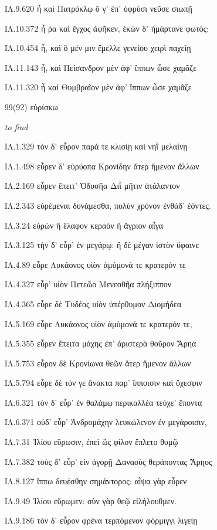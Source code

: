 \begin{enumerate}
{ΙΛ.9.620 ἦ καὶ Πατρόκλῳ ὅ γ' ἐπ' ὀφρύσι νεῦσε σιωπῇ 

ΙΛ.10.372 ἦ ῥα καὶ ἔγχος ἀφῆκεν, ἑκὼν δ' ἡμάρτανε φωτός: 

ΙΛ.10.454 ἦ, καὶ ὃ μέν μιν ἔμελλε γενείου χειρὶ παχείῃ 

ΙΛ.11.143 ἦ, καὶ Πείσανδρον μὲν ἀφ' ἵππων ὦσε χαμᾶζε 

ΙΛ.11.320 ἦ καὶ Θυμβραῖον μὲν ἀφ' ἵππων ὦσε χαμᾶζε 

}

\clearpage
\item[\large 99(92)]{\large \g εὑρίσκω}

\hspace{0.2cm} \textit{ to find }

{\g
ΙΛ.1.329 τὸν δ' εὗρον παρά τε κλισίῃ καὶ νηῒ μελαίνῃ 

ΙΛ.1.498 εὗρεν δ' εὐρύοπα Κρονίδην ἄτερ ἥμενον ἄλλων 

ΙΛ.2.169 εὗρεν ἔπειτ' Ὀδυσῆα Διῒ μῆτιν ἀτάλαντον 

ΙΛ.2.343 εὑρέμεναι δυνάμεσθα, πολὺν χρόνον ἐνθάδ' ἐόντες. 

ΙΛ.3.24 εὑρὼν ἢ ἔλαφον κεραὸν ἢ ἄγριον αἶγα 

ΙΛ.3.125 τὴν δ' εὗρ' ἐν μεγάρῳ: ἣ δὲ μέγαν ἱστὸν ὕφαινε 

ΙΛ.4.89 εὗρε Λυκάονος υἱὸν ἀμύμονά τε κρατερόν τε 

ΙΛ.4.327 εὗρ' υἱὸν Πετεῶο Μενεσθῆα πλήξιππον 

ΙΛ.4.365 εὗρε δὲ Τυδέος υἱὸν ὑπέρθυμον Διομήδεα 

ΙΛ.5.169 εὗρε Λυκάονος υἱὸν ἀμύμονά τε κρατερόν τε, 

ΙΛ.5.355 εὗρεν ἔπειτα μάχης ἐπ' ἀριστερὰ θοῦρον Ἄρηα 

ΙΛ.5.753 εὗρον δὲ Κρονίωνα θεῶν ἄτερ ἥμενον ἄλλων 

ΙΛ.5.794 εὗρε δὲ τόν γε ἄνακτα παρ' ἵπποισιν καὶ ὄχεσφιν 

ΙΛ.6.321 τὸν δ' εὗρ' ἐν θαλάμῳ περικαλλέα τεύχε' ἕποντα 

ΙΛ.6.371 οὐδ' εὗρ' Ἀνδρομάχην λευκώλενον ἐν μεγάροισιν, 

ΙΛ.7.31 Ἰλίου εὕρωσιν, ἐπεὶ ὣς φίλον ἔπλετο θυμῷ 

ΙΛ.7.382 τοὺς δ' εὗρ' εἰν ἀγορῇ Δαναοὺς θεράποντας Ἄρηος 

ΙΛ.8.127 ἵππω δευέσθην σημάντορος: αἶψα γὰρ εὗρεν 

ΙΛ.9.49 Ἰλίου εὕρωμεν: σὺν γὰρ θεῷ εἰλήλουθμεν. 

ΙΛ.9.186 τὸν δ' εὗρον φρένα τερπόμενον φόρμιγγι λιγείῃ 

}
\end{enumerate}
